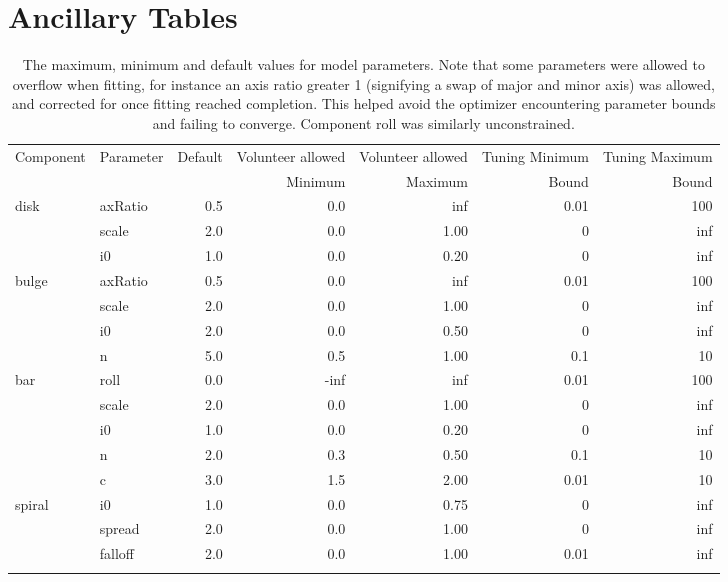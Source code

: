 \documentclass[../main.tex]{subfiles}
\begin{document}
\section{Ancillary Tables}
\begin{table*}
  \centering
  \caption{The maximum, minimum and default values for model parameters. Note that some parameters were allowed to overflow when fitting, for instance an axis ratio greater 1 (signifying a swap of major and minor axis) was allowed, and corrected for once fitting reached completion. This helped avoid the optimizer encountering parameter bounds and failing to converge. Component roll was similarly unconstrained.}
  \begin{tabular}{l|l|r|r|r|r|r}
\hline
Component & Parameter &  Default &  Volunteer allowed &  Volunteer allowed & Tuning Minimum & Tuning Maximum \\
 &  &   &  Minimum &  Maximum & Bound & Bound \\
\hline
disk & axRatio   &      0.5 &       0.0 &      inf &       0.01   & 100   \\
       & scale   &      2.0 &       0.0 &     1.00 &       0      & inf   \\
       & i0      &      1.0 &       0.0 &     0.20 &       0      & inf   \\
bulge & axRatio  &      0.5 &       0.0 &      inf &       0.01   & 100   \\
       & scale   &      2.0 &       0.0 &     1.00 &       0      & inf   \\
       & i0      &      2.0 &       0.0 &     0.50 &       0      & inf   \\
       & n       &      5.0 &       0.5 &     1.00 &       0.1    & 10    \\
bar & roll       &      0.0 &      -inf &      inf &       0.01   & 100   \\
       & scale   &      2.0 &       0.0 &     1.00 &       0      & inf   \\
       & i0      &      1.0 &       0.0 &     0.20 &       0      & inf   \\
       & n       &      2.0 &       0.3 &     0.50 &       0.1    & 10    \\
       & c       &      3.0 &       1.5 &     2.00 &       0.01   & 10    \\
spiral & i0      &      1.0 &       0.0 &     0.75 &       0      & inf   \\
       & spread  &      2.0 &       0.0 &     1.00 &       0      & inf   \\
       & falloff &      2.0 &       0.0 &     1.00 &       0.01   & inf   \\
\hline
  \centering
  \end{tabular}
  \label{table:bad_values}
\end{table*}
\end{document}
